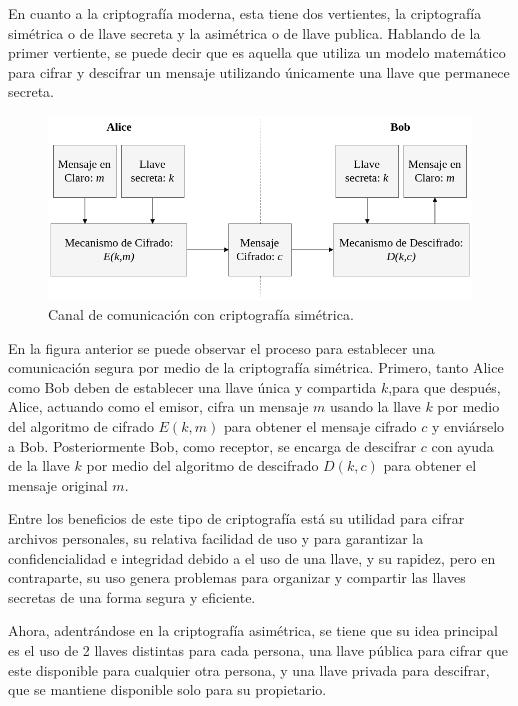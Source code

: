     En cuanto a la criptografía moderna, esta tiene dos vertientes, la 
    criptografía simétrica o de llave secreta y la asimétrica o de llave 
    publica. Hablando de la primer vertiente, se puede decir que es aquella 
    que utiliza un modelo matemático para cifrar y descifrar un mensaje 
    utilizando únicamente una llave que permanece secreta.
  
    \begin{figure}[H]
      \begin{center}
        \includegraphics[width=0.8\linewidth]
          {contenidos/antecedentes/intro_img/cripto_simetrica.png}
        \caption{Canal de comunicación con criptografía simétrica.}
      \end{center}
    \end{figure}
  
    En la figura anterior se puede observar el proceso para establecer una 
    comunicación segura por medio de la criptografía simétrica. Primero, tanto 
    Alice como Bob deben de establecer una llave única y compartida $k$,para 
    que después, Alice, actuando como el emisor, cifra un mensaje $m$ usando 
    la llave $k$ por medio del algoritmo de cifrado $E(k,m)$ para obtener el 
    mensaje cifrado $c$ y enviárselo a Bob. Posteriormente Bob, como receptor, 
    se encarga de descifrar $c$ con ayuda de la llave $k$ por medio del 
    algoritmo de descifrado $D(k,c)$ para obtener el mensaje original $m$.
  
    Entre los beneficios de este tipo de criptografía está su utilidad para 
    cifrar archivos personales, su relativa facilidad de uso y para garantizar 
    la confidencialidad e integridad debido a el uso de una llave, y su 
    rapidez, pero en contraparte, su uso genera problemas para organizar y 
    compartir las llaves secretas de una forma segura y eficiente.
  
    Ahora, adentrándose en la criptografía asimétrica, se tiene que su idea 
    principal es el uso de 2 llaves distintas para cada persona, una llave 
    pública para cifrar que este disponible para cualquier otra persona, y una 
    llave privada para descifrar, que se mantiene disponible solo para su 
    propietario.
  
